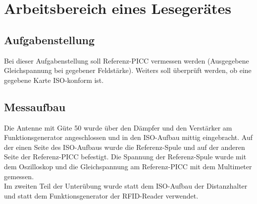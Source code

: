 \documentclass[12pt,a4paper,ngerman]{article}
\begin{document}
\section{Arbeitsbereich eines Lesegerätes}
\subsection{Aufgabenstellung}
Bei dieser Aufgabenstellung soll Referenz-PICC vermessen werden (Ausgegebene Gleichspannung bei gegebener Feldstärke). Weiters soll überprüft werden, ob eine gegebene Karte ISO-konform ist. 
\subsection{Messaufbau}
Die Antenne mit Güte 50 wurde über den Dämpfer und den Verstärker am Funktionsgenerator angeschlossen und in den ISO-Aufbau mittig eingebracht. Auf der einen Seite des ISO-Aufbaus wurde die Referenz-Spule und auf der anderen Seite der Referenz-PICC befestigt. Die Spannung der Referenz-Spule wurde mit dem Oszilloskop und die Gleichspannung am Referenz-PICC mit dem Multimeter gemessen. \\
Im zweiten Teil der Unterübung wurde statt dem ISO-Aufbau der Distanzhalter und statt dem Funktionsgenerator der RFID-Reader verwendet. 
\end{document}
